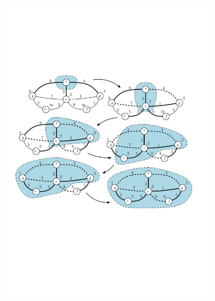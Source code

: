 \documentclass[10pt,xcolor=dvipsnames]{beamer}
\begin{document}
\begin{frame}
	\frametitle{}
	
	\begin{figure}[h]
	\centering
		\includegraphics[scale=0.6]{dijkstra_process.pdf}
	\end{figure}
\end{frame}
\end{document}
